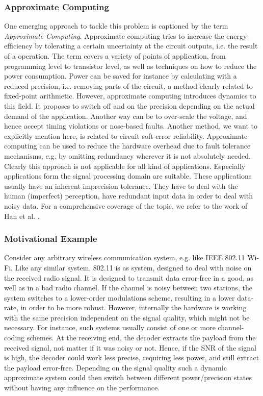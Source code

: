 \documentclass[conference]{IEEEtran}
\begin{document}
\subsubsection*{Approximate Computing}
One emerging approach to tackle this problem is captioned by the term \emph{Approximate Computing}. Approximate computing tries to increase the energy-efficiency by tolerating a certain uncertainty at the circuit outputs, i.e. the result of a operation. The term covers a variety of points of application, from programming level to transistor level, as well as techniques on how to reduce the power consumption. Power can be saved for instance by calculating with a reduced precision, i.e. removing parts of the circuit, a method clearly related to fixed-point arithmetic. However, approximate computing introduces dynamics to this field. It proposes to switch off and on the precision depending on the actual demand of the application. Another way can be to over-scale the voltage, and hence accept timing violations or nose-based faults. Another method, we want to explicitly mention here, is related to circuit soft-error reliability. Approximate computing can be used to reduce the hardware overhead due to fault tolerance mechanisms, e.g. by omitting redundancy wherever it is not absolutely needed. Clearly this approach is not applicable for all kind of applications. Especially applications form the signal processing domain are suitable. These applications usually have an inherent imprecision tolerance. They have to deal with the human (imperfect) perception, have redundant input data in order to deal with noisy data. For a comprehensive coverage of the topic, we refer to the work of Han et al. \cite{han_approximate_2013}.
\subsubsection*{Motivational Example}
Consider any arbitrary wireless communication system, e.g. like IEEE 802.11 Wi-Fi. Like any similar system, 802.11 is as system, designed to deal with noise on the received radio signal. It is designed to transmit data error-free in a good, as well as in a bad radio channel. If the channel is noisy between two stations, the system switches to a lower-order modulations scheme, resulting in a lower data-rate, in order to be more robust. However, internally the hardware is working with the same precision independent on the signal quality, which might not be necessary. For instance, such systems usually consist of one or more channel-coding schemes. At the receiving end, the decoder extracts the payload from the received signal, not matter if it was noisy or not. Hence, if the SNR of the signal is high, the decoder could work less precise, requiring less power, and still extract the payload error-free. Depending on the signal quality such a dynamic approximate system could then switch between different power/precision states without having any influence on the performance.
\end{document}
